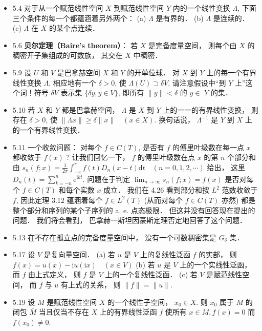 \begin{itemize}
\item 5.4 对于从一个赋范线性空间 $X$ 到赋范线性空间 $Y$ 内的一个线性变换 $\Lambda$, 下面三个条件的每一个都蕴涵着另外两个： (a) $\Lambda$ 是有界的． (b) $\Lambda$ 是连续的． (c) $\Lambda$ 在 $X$ 的某个点连续．

\item 5.6 \textbf{贝尔定理（Baire's theorem）}： 若 $X$ 是完备度量空间， 则每个由 $X$ 的稠密开子集组成的可数族， 其交在 $X$ 中稠密．

\item 5.9 设 $U$ 和 $V$ 是巴拿赫空间 $X$ 和 $Y$ 的开单位球． 对 $X$ 到 $Y$ 上的每一个有界线性变换 $\Lambda$, 相应地有一个 $\delta>0$, 使 $\Lambda(U) \supset \delta V$. 请注意假设中“到 $Y$ 上”这个词！符号 $\delta V$ 表示集 $\{\delta y, y \in V\}$, 即所有 $\|y\|<\delta$ 的 $y \in$ $Y$ 的集．

\item 5.10 若 $X$ 和 $Y$ 都是巴拿赫空间， $\Lambda$ 是 $X$ 到 $Y$ 上的一一的有界线性变换， 则存在 $\delta>0$, 使 $\|\Lambda x\| \geqslant \delta\|x\| \quad(x \in X)$. 换句话说， $\Lambda^{-1}$ 是 $Y$ 到 $X$ 上的一个有界线性变换．

\item 5.11 一个收敛问题： 对每个 $f \in C(T)$, 是否有 $f$ 的傅里叶级数在每一点 $x$ 都收敛于 $f(x)$ ? 让我们回忆一下， $f$ 的傅里叶级数在点 $x$ 的第 $n$ 个部分和由 $s_{n}(f ; x)=\frac{1}{2 \pi} \int_{-\pi}^{\pi} f(t) D_{n}(x-t) \mathrm{d} t \quad(n=0,1,2, \cdots)$ 给出， 这里 $D_{n}(t)=\sum_{k=-n}^{n} \mathrm{e}^{\mathrm{i} k t}$. 问题在于判定 $\lim _{n \rightarrow \infty} s_{n}(f ; x)=f(x)$ 是否对每个 $f \in C(T)$ 和每个实数 $x$ 成立． 我们在 4.26 看到部分和按 $L^{2}$ 范数收敛于 $f$, 因此定理 3.12 蕴涵着每个 $f \in L^{2}(T)$ (从而对每个 $f \in C(T)$ 亦然) 都是整个部分和序列的某个子序列的 a. e. 点态极限． 但这并没有回答现在提出的问题． 我们将会看到， 巴拿赫一斯坦因豪斯定理否定地回答了这个问题．

\item 5.13 在不存在孤立点的完备度量空间中， 没有一个可数稠密集是 $G_{\delta}$ 集．

\item 5.17 设 $V$ 是复向量空间． (a) 若 $u$ 是 $V$ 上的复线性泛函 $f$ 的实部， 则 $f(x)=u(x)-\mathrm{i} u(\mathrm{i} x) \quad(x \in V)$ (b) 若 $u$ 是 $V$ 上的一个实线性泛函， 而 $f$ 由上式定义， 则 $f$ 是 $V$ 上的一个复线性泛函． (c) 若 $V$ 是赋范线性空间， 而 $f$ 与 $u$ 有上式的关系， 则 $\|f\|=\|u\|$.

\item 5.19 设 $M$ 是赋范线性空间 $X$ 的一个线性子空间， $x_{0} \in X$. 则 $x_{0}$ 属于 $M$ 的闭包 $\bar{M}$ 当且仅当不存在 $X$ 上的有界线性泛函 $f$ 使所有 $x \in M, f(x)=0$ 而 $f\left(x_{0}\right) \neq 0$.


\end{itemize}
